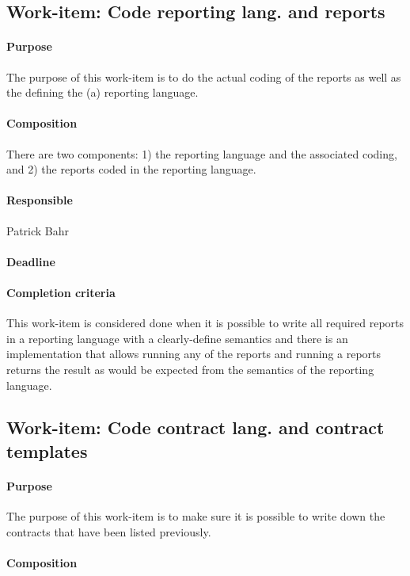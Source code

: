 \documentclass[envcountsame]{llncs}
\begin{document}
\subsection*{Work-item: Code reporting lang. and reports}
\paragraph{Purpose} The purpose of this work-item is to do the actual
coding of the reports as well as the defining the (a) reporting
language.

\paragraph{Composition} There are two components: 1) the reporting
language and the associated coding, and 2) the reports coded in the
reporting language.

\paragraph{Responsible} Patrick Bahr

\paragraph{Deadline}

\paragraph{Completion criteria} This work-item is considered done when
it is possible to write all required reports in a reporting language
with a clearly-define semantics and there is an implementation that
allows running any of the reports and running a reports returns the
result as would be expected from the semantics of the reporting
language.

\subsection*{Work-item: Code contract lang. and contract templates}
\paragraph{Purpose} The purpose of this work-item is to make sure it
is possible to write down the contracts that have been listed
previously.

\paragraph{Composition} 
\end{document}
